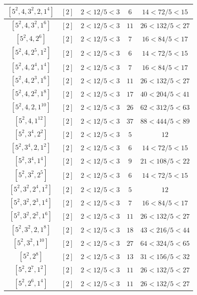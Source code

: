 \documentclass{article}%
\begin{document}
\begin{center}
\begin{longtable}{||c|c|c|c|c||}
$[5^{2}, 4, 3^{2}, 2, 1^{4}]$ & $[2]$ & $2 < 12/5 < 3$ & $6$ & $14 < 72/5 < 15$ \\ \hline 
$[5^{2}, 4, 3^{2}, 1^{6}]$ & $[2]$ & $2 < 12/5 < 3$ & $11$ & $26 < 132/5 < 27$ \\ \hline 
$[5^{2}, 4, 2^{6}]$ & $[2]$ & $2 < 12/5 < 3$ & $7$ & $16 < 84/5 < 17$ \\ \hline 
$[5^{2}, 4, 2^{5}, 1^{2}]$ & $[2]$ & $2 < 12/5 < 3$ & $6$ & $14 < 72/5 < 15$ \\ \hline 
$[5^{2}, 4, 2^{4}, 1^{4}]$ & $[2]$ & $2 < 12/5 < 3$ & $7$ & $16 < 84/5 < 17$ \\ \hline 
$[5^{2}, 4, 2^{3}, 1^{6}]$ & $[2]$ & $2 < 12/5 < 3$ & $11$ & $26 < 132/5 < 27$ \\ \hline 
$[5^{2}, 4, 2^{2}, 1^{8}]$ & $[2]$ & $2 < 12/5 < 3$ & $17$ & $40 < 204/5 < 41$ \\ \hline 
$[5^{2}, 4, 2, 1^{10}]$ & $[2]$ & $2 < 12/5 < 3$ & $26$ & $62 < 312/5 < 63$ \\ \hline 
$[5^{2}, 4, 1^{12}]$ & $[2]$ & $2 < 12/5 < 3$ & $37$ & $88 < 444/5 < 89$ \\ \hline 
$[5^{2}, 3^{4}, 2^{2}]$ & $[2]$ & $2 < 12/5 < 3$ & $5$ & $12$ \\ \hline 
$[5^{2}, 3^{4}, 2, 1^{2}]$ & $[2]$ & $2 < 12/5 < 3$ & $6$ & $14 < 72/5 < 15$ \\ \hline 
$[5^{2}, 3^{4}, 1^{4}]$ & $[2]$ & $2 < 12/5 < 3$ & $9$ & $21 < 108/5 < 22$ \\ \hline 
$[5^{2}, 3^{2}, 2^{5}]$ & $[2]$ & $2 < 12/5 < 3$ & $6$ & $14 < 72/5 < 15$ \\ \hline 
$[5^{2}, 3^{2}, 2^{4}, 1^{2}]$ & $[2]$ & $2 < 12/5 < 3$ & $5$ & $12$ \\ \hline 
$[5^{2}, 3^{2}, 2^{3}, 1^{4}]$ & $[2]$ & $2 < 12/5 < 3$ & $7$ & $16 < 84/5 < 17$ \\ \hline 
$[5^{2}, 3^{2}, 2^{2}, 1^{6}]$ & $[2]$ & $2 < 12/5 < 3$ & $11$ & $26 < 132/5 < 27$ \\ \hline 
$[5^{2}, 3^{2}, 2, 1^{8}]$ & $[2]$ & $2 < 12/5 < 3$ & $18$ & $43 < 216/5 < 44$ \\ \hline 
$[5^{2}, 3^{2}, 1^{10}]$ & $[2]$ & $2 < 12/5 < 3$ & $27$ & $64 < 324/5 < 65$ \\ \hline 
$[5^{2}, 2^{8}]$ & $[2]$ & $2 < 12/5 < 3$ & $13$ & $31 < 156/5 < 32$ \\ \hline 
$[5^{2}, 2^{7}, 1^{2}]$ & $[2]$ & $2 < 12/5 < 3$ & $11$ & $26 < 132/5 < 27$ \\ \hline 
$[5^{2}, 2^{6}, 1^{4}]$ & $[2]$ & $2 < 12/5 < 3$ & $11$ & $26 < 132/5 < 27$ \\ \hline 

\end{longtable}
\end{center}
\end{document}

